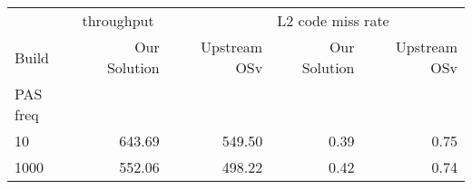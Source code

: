 \begin{tabular}{lrrrr}
\toprule
{} & \multicolumn{2}{l}{throughput} & \multicolumn{2}{l}{L2 code miss rate} \\
Build & Our Solution & Upstream OSv &      Our Solution & Upstream OSv \\
PAS freq &              &              &                   &              \\
\midrule
10       &       643.69 &       549.50 &              0.39 &         0.75 \\
1000     &       552.06 &       498.22 &              0.42 &         0.74 \\
\bottomrule
\end{tabular}

